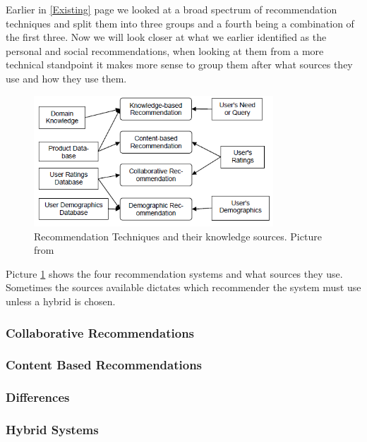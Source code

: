 Earlier in \ref{Existing} page \pageref{Existing} we looked at a broad spectrum of recommendation techniques and  split them into three groups and a fourth being a combination of the first three. Now we will look closer at what we earlier identified as the personal and social recommendations, when looking at them from a more technical standpoint it makes more sense to group them after what sources they use and how they use them.

\begin{figure}[H]
\centering
\includegraphics[width=0.8\textwidth]{Images/RecTypes.png}
\caption{Recommendation Techniques and their knowledge sources. Picture from \cite{TheAdaptiveWeb}}
\label{RecTypes}
\end{figure}

Picture \ref{RecTypes} shows the four recommendation systems and what sources they use. Sometimes the sources available dictates which recommender the system must use unless a hybrid is chosen. 


\subsubsection{Collaborative Recommendations} 
\label{Collaborative} 

\subsubsection{Content Based Recommendations} 
\label{ContentBased} 

\subsubsection{Differences}
\label{Differences} 

\subsubsection{Hybrid Systems} 
\label{Hybrid} 
